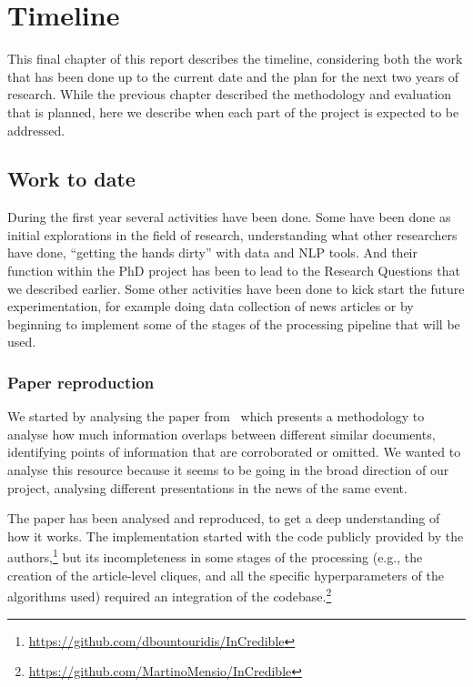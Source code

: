 \chapter{Timeline}
\label{chap:plan}

This final chapter of this report describes the timeline, considering both the work that has been done up to the current date and the plan for the next two years of research.
While the previous chapter described the methodology and evaluation that is planned, here we describe when each part of the project is expected to be addressed.

\section{Work to date}

During the first year several activities have been done.
Some have been done as initial explorations in the field of research, understanding what other researchers have done, ``getting the hands dirty'' with data and NLP tools.
And their function within the PhD project has been to lead to the Research Questions that we described earlier.
Some other activities have been done to kick start the future experimentation, for example doing data collection of news articles or by beginning to implement some of the stages of the processing pipeline that will be used.


\subsection{Paper reproduction~\cite{bountouridis2018explaining}}
We started by analysing the paper from~\citet{bountouridis2018explaining} which presents a methodology to analyse how much information overlaps between different similar documents, identifying points of information that are corroborated or omitted.
We wanted to analyse this resource because it seems to be going in the broad direction of our project, analysing different presentations in the news of the same event.

The paper has been analysed and reproduced, to get a deep understanding of how it works. The implementation started with the code publicly provided by the authors,\footnote{\url{https://github.com/dbountouridis/InCredible}} but its incompleteness in some stages of the processing (e.g., the creation of the article-level cliques, and all the specific hyperparameters of the algorithms used) required an integration of the codebase.\footnote{\url{https://github.com/MartinoMensio/InCredible}}

